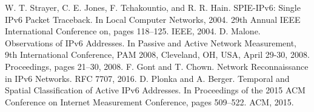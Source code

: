\documentclass[master]{zzuthesis}
\begin{document}
\frontmatter

\makecover

\tableofcontents%



\mainmatter





\backmatter

\begin{thebibliography}{10}
W. T. Strayer, C. E. Jones, F. Tchakountio, and R. R. Hain. SPIE-IPv6: Single IPv6 Packet Traceback. In Local Computer Networks, 2004. 29th Annual IEEE International Conference on, pages 118–125. IEEE, 2004.
D. Malone. Observations of IPv6 Addresses. In Passive and Active Network Measurement, 9th International Conference, PAM 2008, Cleveland, OH, USA, April 29-30, 2008. Proceedings, pages 21–30, 2008.
F. Gont and T. Chown. Network Reconnaissance in IPv6 Networks. RFC 7707, 2016.
D. Plonka and A. Berger. Temporal and Spatial Classification of Active IPv6 Addresses. In Proceedings of the 2015 ACM Conference on Internet Measurement Conference, pages 509–522. ACM, 2015.
\end{thebibliography}

%   

%   

%     
%     
%     


%   
\end{document}
